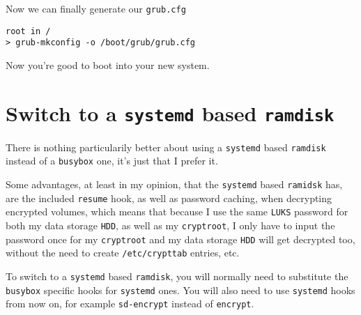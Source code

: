 \documentclass[10pt]{dustdoc}
\begin{document}
Now we can finally generate our \texttt{grub.cfg}

\begin{verbatim}
root in /
> grub-mkconfig -o /boot/grub/grub.cfg
\end{verbatim}

Now you’re good to boot into your new system.

\section{Switch to a \texttt{systemd} based \texttt{ramdisk}}%
\label{sec:switch-to-a-systemd-based-ramdisk}

\begin{NOTE}
    There is nothing particularily better about using a \texttt{systemd} based \texttt{ramdisk} instead of a \texttt{busybox} one, it’s just that I prefer it.

    Some advantages, at least in my opinion, that the \texttt{systemd} based \texttt{ramidsk} has, are the included \texttt{resume} hook, as well as password caching, when decrypting encrypted volumes, which means that because I use the same \texttt{LUKS} password for both my data storage \texttt{HDD}, as well as my \texttt{cryptroot}, I only have to input the password once for my \texttt{cryptroot} and my data storage \texttt{HDD} will get decrypted too, without the need to create \texttt{/etc/crypttab} entries, etc.
\end{NOTE}

To switch to a \texttt{systemd} based \texttt{ramdisk}, you will normally need to substitute the \texttt{busybox} specific hooks for \texttt{systemd} ones.
You will also need to use \texttt{systemd} hooks from now on, for example \texttt{sd-encrypt} instead of \texttt{encrypt}.
\end{document}
